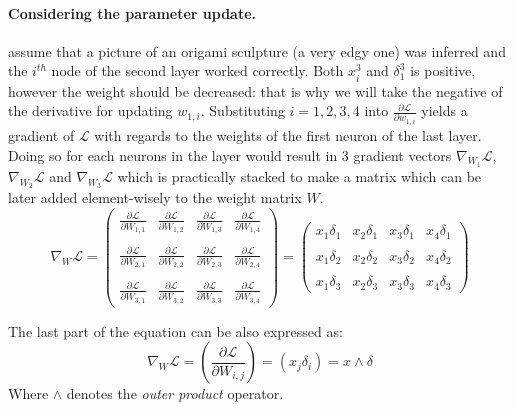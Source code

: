 \paragraph{Considering the parameter update.} assume that a picture of an origami sculpture (a very edgy one) was inferred and the $i^{th}$ node of the second layer worked correctly. Both $x^3_i$ and $\delta^3_1$ is positive, however the weight should be decreased: that is why we will take the negative of the derivative for updating $w_{1,i}$.
Substituting $i=1,2,3,4$ into $\frac{\partial \mathcal{L}}{\partial w_{1,i}}$ yields a gradient of $\mathcal{L}$ with regards to the weights of the first neuron of the last layer. 
Doing so for each neurons in the layer would result in 3 gradient vectors $\nabla_{W_1} \mathcal{L}$, $\nabla_{W_2} \mathcal{L}$ and $\nabla_{W_3 }\mathcal{L}$ which is practically stacked to make a matrix which can be later added element-wisely to the weight matrix $W$.
$$
\nabla_W \mathcal{L} = 
\begin{pmatrix}
\frac{\partial \mathcal{L}}{\partial W_{1,1}} & \frac{\partial \mathcal{L}}{\partial W_{1,2}} & \frac{\partial \mathcal{L}}{\partial W_{1,3}} & \frac{\partial \mathcal{L}}{\partial W_{1,4}} \\ \\
\frac{\partial \mathcal{L}}{\partial W_{2,1}} & \frac{\partial \mathcal{L}}{\partial W_{2,2}} & \frac{\partial \mathcal{L}}{\partial W_{2,3}} & \frac{\partial \mathcal{L}}{\partial W_{2,4}} \\ \\
\frac{\partial \mathcal{L}}{\partial W_{3,1}} & \frac{\partial \mathcal{L}}{\partial W_{3,2}} & \frac{\partial \mathcal{L}}{\partial W_{3,3}} & \frac{\partial \mathcal{L}}{\partial W_{3,4}}
\end{pmatrix} = 
\begin{pmatrix}
 x_1 \delta_1 &  x_2 \delta_1 &  x_3 \delta_1 &  x_4 \delta_1 \\ \\
 x_1 \delta_2 &  x_2 \delta_2 &  x_3 \delta_2 &  x_4 \delta_2 \\ \\
 x_1 \delta_3 &  x_2 \delta_3 &  x_3 \delta_3 &  x_4 \delta_3
\end{pmatrix}
$$

The last part of the equation can be also expressed as:
\begin{equation}
\nabla_W \mathcal{L} = \left(\frac{\partial \mathcal{L}}{\partial W_{i,j}}\right) = \left(x_j \delta_i\right) = x \wedge \delta
\end{equation}
Where $\wedge$ denotes the \emph{outer product} operator. 


